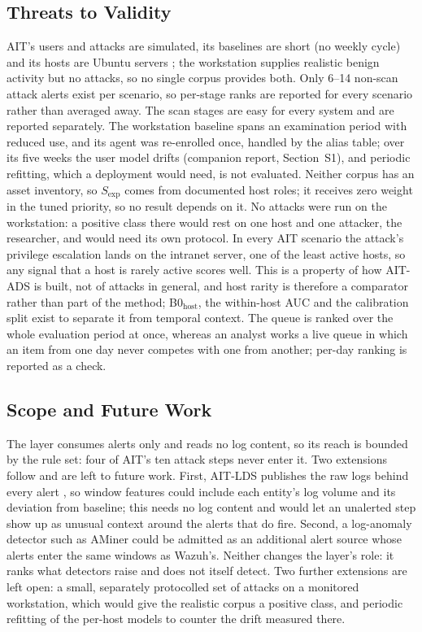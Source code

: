 \documentclass[conference]{IEEEtran}
\begin{document}
\subsection{Threats to Validity}
\label{sec:threats}

AIT's users and attacks are simulated, its baselines are short (no weekly cycle) and its hosts are Ubuntu servers \cite{ref22}; the workstation supplies realistic benign activity but no attacks, so no single corpus provides both. Only 6--14 non-scan attack alerts exist per scenario, so per-stage ranks are reported for every scenario rather than averaged away. The scan stages are easy for every system and are reported separately. The workstation baseline spans an examination period with reduced use, and its agent was re-enrolled once, handled by the alias table; over its five weeks the user model drifts (companion report, Section~S1), and periodic refitting, which a deployment would need, is not evaluated. Neither corpus has an asset inventory, so $S_\mathrm{exp}$ comes from documented host roles; it receives zero weight in the tuned priority, so no result depends on it. No attacks were run on the workstation: a positive class there would rest on one host and one attacker, the researcher, and would need its own protocol. In every AIT scenario the attack's privilege escalation lands on the intranet server, one of the least active hosts, so any signal that a host is rarely active scores well. This is a property of how AIT-ADS is built, not of attacks in general, and host rarity is therefore a comparator rather than part of the method; B0$_\mathrm{host}$, the within-host AUC and the calibration split exist to separate it from temporal context. The queue is ranked over the whole evaluation period at once, whereas an analyst works a live queue in which an item from one day never competes with one from another; per-day ranking is reported as a check.

\subsection{Scope and Future Work}

The layer consumes alerts only and reads no log content, so its reach is bounded by the rule set: four of AIT's ten attack steps never enter it. Two extensions follow and are left to future work. First, AIT-LDS publishes the raw logs behind every alert \cite{ref22}, so window features could include each entity's log volume and its deviation from baseline; this needs no log content and would let an unalerted step show up as unusual context around the alerts that do fire. Second, a log-anomaly detector such as AMiner could be admitted as an additional alert source whose alerts enter the same windows as Wazuh's. Neither changes the layer's role: it ranks what detectors raise and does not itself detect. Two further extensions are left open: a small, separately protocolled set of attacks on a monitored workstation, which would give the realistic corpus a positive class, and periodic refitting of the per-host models to counter the drift measured there.
\end{document}
